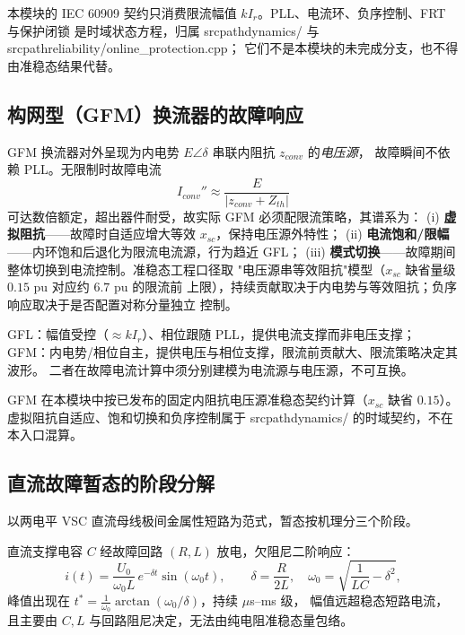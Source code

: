 \begin{theorynote}
本模块的 IEC 60909 契约只消费限流幅值 $kI_r$。PLL、电流环、负序控制、FRT 与保护闭锁
是时域状态方程，归属 srcpath{dynamics/} 与 srcpath{reliability/online\_protection.cpp}；
它们不是本模块的未完成分支，也不得由准稳态结果代替。
\end{theorynote}

\subsection{构网型（GFM）换流器的故障响应}
GFM 换流器对外呈现为内电势 $E\angle\delta$ 串联内阻抗 $z_{conv}$ 的\emph{电压源}，
故障瞬间不依赖 PLL。无限制时故障电流
\begin{equation}
I_{conv}''\approx\frac{E}{|z_{conv}+Z_{th}|}
\end{equation}
可达数倍额定，超出器件耐受，故实际 GFM 必须配限流策略，其谱系为：
(i) \textbf{虚拟阻抗}——故障时自适应增大等效 $x_{sc}$，保持电压源外特性；
(ii) \textbf{电流饱和/限幅}——内环饱和后退化为限流电流源，行为趋近 GFL；
(iii) \textbf{模式切换}——故障期间整体切换到电流控制。准稳态工程口径取
"电压源串等效阻抗"模型（$x_{sc}$ 缺省量级 $0.15$ pu 对应约 $6.7$ pu 的限流前
上限），持续贡献取决于内电势与等效阻抗；负序响应取决于是否配置对称分量独立
控制。

\begin{remark}
GFL：幅值受控（$\approx kI_r$）、相位跟随 PLL，提供电流支撑而非电压支撑；
GFM：内电势/相位自主，提供电压与相位支撑，限流前贡献大、限流策略决定其波形。
二者在故障电流计算中须分别建模为电流源与电压源，不可互换。
\end{remark}

\begin{theorynote}
GFM 在本模块中按已发布的固定内阻抗电压源准稳态契约计算（$x_{sc}$ 缺省 $0.15$）。
虚拟阻抗自适应、饱和切换和负序控制属于 srcpath{dynamics/} 的时域契约，不在本入口混算。
\end{theorynote}

\subsection{直流故障暂态的阶段分解}
以两电平 VSC 直流母线极间金属性短路为范式，暂态按机理分三个阶段。

\begin{definition}[阶段 1：电容放电]
直流支撑电容 $C$ 经故障回路 $(R,L)$ 放电，欠阻尼二阶响应：
\begin{equation}
i(t)=\frac{U_0}{\omega_0 L}\,e^{-\delta t}\sin(\omega_0 t),\qquad
\delta=\frac{R}{2L},\quad
\omega_0=\sqrt{\frac{1}{LC}-\delta^2},
\end{equation}
峰值出现在 $t^{*}=\frac{1}{\omega_0}\arctan(\omega_0/\delta)$，持续 $\mu$s--ms 级，
幅值远超稳态短路电流，且主要由 $C,L$ 与回路阻尼决定，无法由纯电阻准稳态量包络。
\end{definition}

